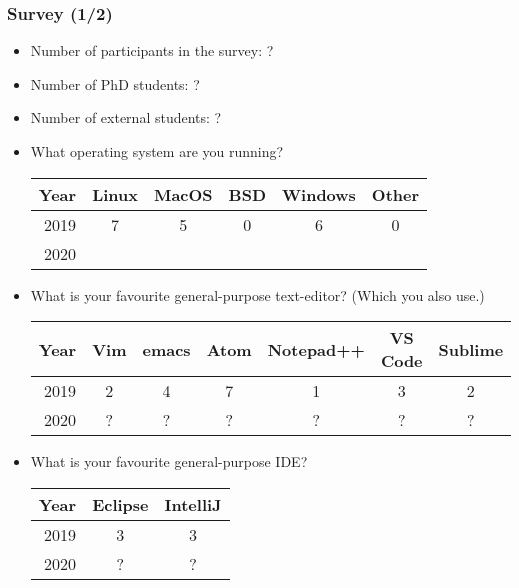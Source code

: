 \def\arraystretch{1.2}

\begin{frame}

\frametitle{Survey (1/2)}

\begin{itemize}

\footnotesize

\item Number of participants in the survey: ?

\item Number of PhD students: ?

\item Number of external students: ?

\item What operating system are you running?

\begin{tabular}{|r|c|c|c|c|c|}
\hline
\textbf{Year} & \textbf{Linux} & \textbf{MacOS} & \textbf{BSD} &%
\textbf{Windows} & \textbf{Other}
\\\hline
2019 & 7 & 5 & 0 & 6 & 0 \\\hline
2020 &   &   &   &   &   \\\hline
\end{tabular}

\item What is your favourite general-purpose text-editor? (Which you also use.)

\begin{tabular}{|r|c|c|c|c|c|c|}
\hline
\textbf{Year} & \textbf{Vim} & \textbf{emacs} & \textbf{Atom} &%
\textbf{Notepad++} & \textbf{VS Code} & \textbf{Sublime}
\\\hline
2019 & 2 & 4 & 7 & 1 & 3 & 2 \\\hline
2020 & ? & ? & ? & ? & ? & ? \\\hline
\end{tabular}

\item What is your favourite general-purpose IDE?

\begin{tabular}{|r|c|c|}
\hline
\textbf{Year} & \textbf{Eclipse} & \textbf{IntelliJ}
\\\hline
2019 & 3 & 3 \\\hline
2020 & ? & ? \\\hline
\end{tabular}

\end{itemize}

\end{frame}

